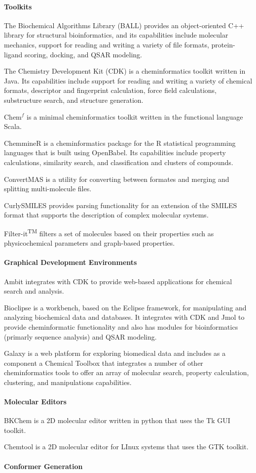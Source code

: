 \paragraph{Toolkits}
The Biochemical Algorithms Library (BALL) \cite{Hildebrandt_2010} provides an object-oriented C++ library for structural bioinformatics, and its capabilities include molecular mechanics, support for reading and writing a variety of file formats, protein-ligand scoring, docking, and QSAR modeling.

The Chemistry Development Kit (CDK) \cite{Steinbeck_2006} is a cheminformatics toolkit written in Java.  Its capabilities include support for reading and writing a variety of chemical formats, descriptor and fingerprint calculation, force field calculations, substructure search, and structure generation.

Chem$^f$ \cite{H_ck_2012} is a minimal cheminformatics toolkit written in the functional language Scala.

ChemmineR \cite{Cao_2008}  is a cheminformatics package for the R statistical programming languages that is built using OpenBabel. Its capabilities include property calculations, similarity search, and classification and clusters of compounds.

ConvertMAS is a utility for converting between formates and merging and splitting multi-molecule files.

CurlySMILES \cite{Drefahl_2011} provides parsing functionality for an extension of the SMILES format that supports the description of complex molecular systems.

Filter-it\textsuperscript{TM} filters a set of molecules based on their properties such as physicochemical parameters and graph-based properties. 

\paragraph{Graphical Development Environments}

Ambit \cite{Jeliazkova_2011} integrates with CDK to provide web-based applications for chemical search and analysis.

Bioclipse  \cite{Spjuth_2009} is a workbench, based on the Eclipse framework, for manipulating and analyzing biochemical data and databases. It integrates with CDK and Jmol to provide cheminformatic functionality and also has modules for bioinformatics (primarly sequence analysis) and QSAR modeling.

Galaxy \cite{Goecks_2010} is a web platform for exploring biomedical data and includes as a component a Chemical Toolbox that integrates a number of other cheminformatics tools to offer an array of molecular search, property calculation, clustering, and manipulations capabilities.


\paragraph{Molecular Editors}

BKChem is a 2D molecular editor written in python that uses the Tk GUI toolkit.

Chemtool is a 2D molecular editor for LInux systems that uses the GTK toolkit.

\paragraph{Conformer Generation}

